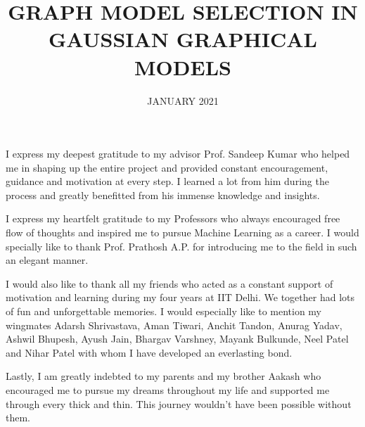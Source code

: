 \documentclass[BTech]{iittpdiss}
\begin{document}

\title{GRAPH MODEL SELECTION IN GAUSSIAN GRAPHICAL MODELS}


\date{JANUARY 2021}

\maketitle


%



\acknowledgements

I express my deepest gratitude to my advisor Prof. Sandeep Kumar who helped me in shaping up the entire project and provided constant encouragement, guidance and motivation at every step. I learned a lot from him during the process and greatly benefitted from his immense knowledge and insights.

I express my heartfelt gratitude to my Professors who always encouraged free flow of thoughts and inspired me to pursue Machine Learning as a career. I would specially like to thank Prof. Prathosh A.P. for introducing me to the field in such an elegant manner. 

I would also like to thank all my friends who acted as a constant support of motivation and learning during my four years at IIT Delhi. We together had lots of fun and unforgettable memories. I would especially like to mention my wingmates Adarsh Shrivastava, Aman Tiwari, Anchit Tandon, Anurag Yadav, Ashwil Bhupesh, Ayush Jain, Bhargav Varshney, Mayank Bulkunde, Neel Patel and Nihar Patel with whom I have developed an everlasting bond.

Lastly, I am greatly indebted to my parents and my brother Aakash who encouraged me to pursue my dreams throughout my life and supported me through every thick and thin. This journey wouldn\rq{}t have been possible without them.


\end{document}
